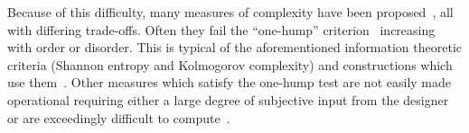 Because of this difficulty, many measures of complexity have been
proposed~\citep{lloyd2001measures}, all with differing trade-offs. Often they
fail the ``one-hump'' criterion~\citep{adami2002complexity} increasing with
order or disorder. This is typical of the aforementioned information theoretic
criteria (Shannon entropy and Kolmogorov complexity) and constructions which
use them~\citep{lloyd1988complexity}. Other measures which satisfy the one-hump
test are not easily made operational requiring either a large degree of
subjective input from the designer or are exceedingly difficult to
compute~\citep{crutchfield1989inferring, gell1996information,
grassberger1986toward}.
